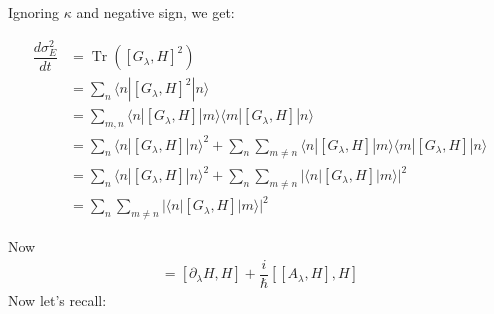 \documentclass[11pt,a4paper]{article}
\DeclareMathOperator{\Tr}{Tr}
\begin{document}
Ignoring $\kappa$ and negative sign, we get:

\begin{align}
\dfrac{d \sigma^2_E}{dt}&= \Tr ([G_{\lambda}, H]^2)\\
&= \sum_n \langle n |  [G_{\lambda}, H]^2  |    n \rangle  \\
&= \sum_{m,n} \langle n |  [G_{\lambda}, H]|  m \rangle \langle m |  [G_{\lambda}, H]  |    n \rangle \\
&= \sum_{n} \langle n |  [G_{\lambda}, H]|  n \rangle ^2   +  \sum_{ n} \sum_{m \neq n} \langle n |  [G_{\lambda}, H]|  m \rangle \langle m |  [G_{\lambda}, H]  |    n \rangle \\
&= \sum_{n} \langle n |  [G_{\lambda}, H]|  n \rangle ^2   +  \sum_{ n} \sum_{m \neq n} |\langle n |  [G_{\lambda}, H]|  m \rangle |^2 \\
&=  \sum_{ n} \sum_{m \neq n} |\langle n |  [G_{\lambda}, H]|  m \rangle |^2
\end{align}

Now \begin{align*}
 [G_{\lambda}, H]= [\partial_{\lambda} H,H] + \dfrac{i}{\hbar} [[A_{\lambda} , H],H]
\end{align*}
Now let's recall:
\end{document}
